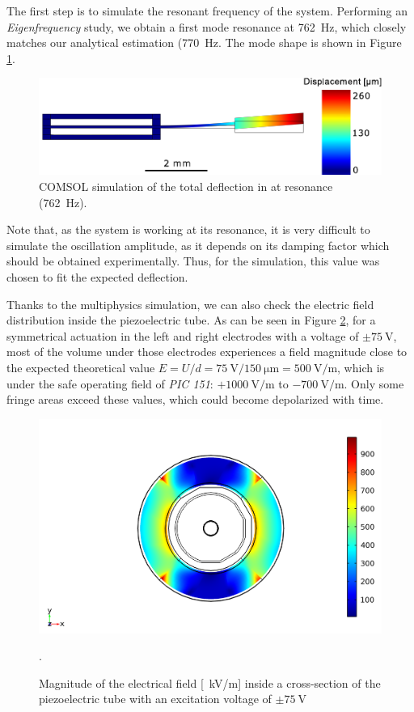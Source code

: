 The first step is to simulate the resonant frequency of the system. Performing an \textit{Eigenfrequency} study, we obtain a first mode resonance at \SI{762}{\hertz}, which closely matches our analytical estimation (\SI{770}{\hertz}. The mode shape is shown in Figure \ref{fig:defle}.

\begin{figure}[h!]\centering
      \includegraphics[width=10 cm]{figures/30_DesignSimulation/Mechanical/deflection.pdf}
      \caption{COMSOL simulation of the total deflection in at resonance (\SI{762}{\hertz}).}
      \label{fig:defle}
\end{figure}

Note that, as the system is working at its resonance, it is very difficult to simulate the oscillation amplitude, as it depends on its damping factor which should be obtained experimentally. Thus, for the simulation, this value was chosen to fit the expected deflection. 

Thanks to the multiphysics simulation, we can also check the electric field distribution inside the piezoelectric tube. As can be seen in Figure \ref{fig:field}, for a symmetrical actuation in the left and right electrodes with a voltage of $\pm \SI{75}{\volt}$, most of the volume under those electrodes experiences a field magnitude close to the expected theoretical value $E=U/d = \SI{75}{\volt}/\SI{150}{\micro\meter} = \SI{500}{\volt/\meter}$, which is under the safe operating field of \textit{PIC 151}: $ +\SI{1000}{\volt/\meter}$ to $ -\SI{700}{\volt/\meter}$. Only some fringe areas exceed these values, which could become depolarized with time.
\begin{figure}[h!]\centering
      \includegraphics[width=10 cm]{figures/30_DesignSimulation/Mechanical/field.png}
      \caption{Magnitude of the electrical field [\SI{}{\kilo \volt / \meter}] inside a cross-section of the piezoelectric tube with an excitation voltage of $\pm \SI{75}{\volt}$}.
      \label{fig:field}
\end{figure}





